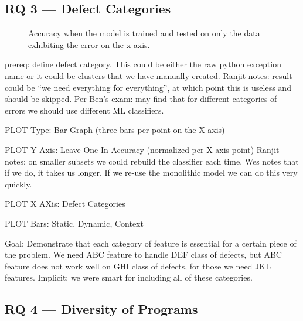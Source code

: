 \documentclass[conference]{IEEEtran}
\begin{document}

\subsection{RQ 3 --- Defect Categories}

\begin{figure}
\caption{Accuracy when the model is trained and tested on only the data exhibiting
the error on the x-axis.}
\label{fig:defect-categories}
\end{figure}

prereq: define defect category. This could be either the raw python
exception name or it could be clusters that we have manually created.
Ranjit notes: result could be ``we need everything for everything'', at
which point this is useless and should be skipped. Per Ben's exam: may find
that for different categories of errors we should use different ML
classifiers.

PLOT Type: Bar Graph (three bars per point on the X axis)

PLOT Y Axis: Leave-One-In Accuracy (normalized per X axis point)
Ranjit notes: on smaller subsets we could rebuild the classifier each time.
Wes notes that if we do, it takes us longer. If we re-use the monolithic
model we can do this very quickly.

PLOT X AXis: Defect Categories

PLOT Bars: Static, Dynamic, Context

Goal: Demonstrate that each category of feature is essential for a certain
piece of the problem. We need ABC feature to handle DEF class of defects,
but ABC feature does not work well on GHI class of defects, for those we
need JKL features. Implicit: we were smart for including all of these
categories.

\subsection{RQ 4 --- Diversity of Programs}
\end{document}
